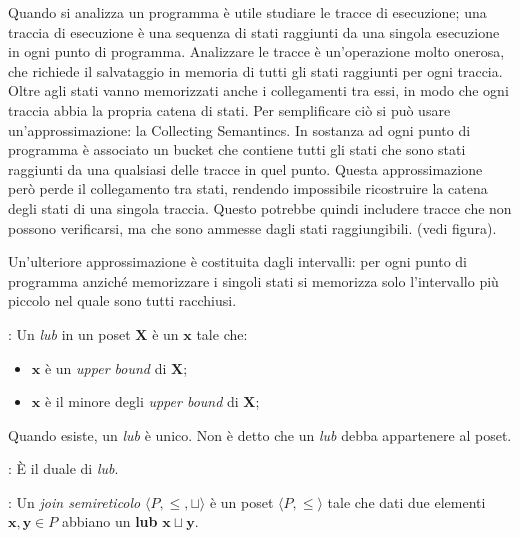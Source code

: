 \documentclass[a4paper,12pt,openany]{article}
\newenvironment{definition}[1][Definizione]{\begin{trivlist}
\item[\hskip \labelsep {\bfseries #1}]}{\end{trivlist}}
\begin{document}
    Quando si analizza un programma è utile studiare le tracce di esecuzione; una traccia di esecuzione è una sequenza di stati raggiunti da una singola esecuzione in ogni punto di programma. Analizzare le tracce è un'operazione molto onerosa, che richiede il salvataggio in memoria di tutti gli stati raggiunti per ogni traccia. Oltre agli stati vanno memorizzati anche i collegamenti tra essi, in modo che ogni traccia abbia la propria catena di stati. Per semplificare ciò si può usare un'approssimazione: la Collecting Semantincs. In sostanza ad ogni punto di programma è associato un bucket che contiene tutti gli stati che sono stati raggiunti da una qualsiasi delle tracce in quel punto. Questa approssimazione però perde il collegamento tra stati, rendendo impossibile ricostruire la catena degli stati di una singola traccia. Questo potrebbe quindi includere tracce che non possono verificarsi, ma che sono ammesse dagli stati raggiungibili. (vedi figura).
    
    Un'ulteriore approssimazione è costituita dagli intervalli: per ogni punto di programma anziché memorizzare i singoli stati si memorizza solo l'intervallo più piccolo nel quale sono tutti racchiusi.
    
    \begin{definition}[Least upper bound (\textbf{lub})]: Un \textit{lub} in un poset $\textbf{X}$ è un $\textbf{x}$ tale che:
            \begin{itemize}
                \item $\textbf{x}$ è un \textit{upper bound} di $\textbf{X}$;
                \item $\textbf{x}$ è il minore degli \textit{upper bound} di $\textbf{X}$;
            \end{itemize}
            Quando esiste, un \emph{lub} è unico. Non è detto che un \emph{lub} debba appartenere al
            poset.
    \end{definition}
    
    \begin{definition}[Greatest lower bound (\textbf{glb})]: È il  duale di \emph{lub}.
    \end{definition}
    
    \begin{definition}[Join semireticolo]: Un \emph{join semireticolo} $\langle P, \leq, \sqcup \rangle$ è un poset
            $\langle P, \leq \rangle$ tale che dati due elementi $\mathbf{x}, \mathbf{y} \in P$ abbiano
            un \textbf{lub} $\mathbf{x} \sqcup \mathbf{y}$.
    \end{definition}
    
\end{document}
